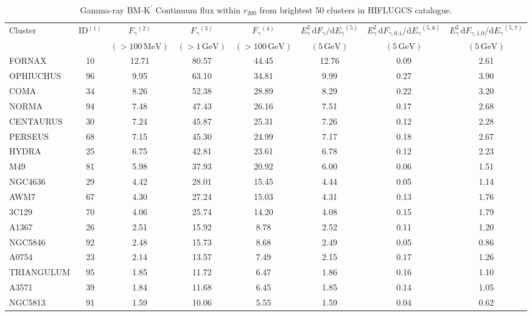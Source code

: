 \documentclass[10pt,aps,pra,reprint,amsmath,amsfonts,amssymb,showpacs,nofootinbib,floatfix]{revtex4-1}
\newcommand{\rmn}{\mathrm}
\newcommand{\Kp}{\rmn{K}^\prime}
\newcommand{\dd}{\rmn{d}}
\newcommand{\rvir}{r_{200}}
\newcommand{\eg}{E_\gamma}
\begin{document}
\begin{table}
\begin{minipage}{2.0\columnwidth}
  \caption{Gamma-ray BM-$\Kp$ Continuum flux within $\rvir$ from brightest 50 clusters in HIFLUGCS catalogue.}
\begin{tabular}{l  c c c c c c c}
\hline
\hline
 Cluster & ID$^{(1)}$ & $F_{\gamma}$$^{(2)}$ & $F_{\gamma}$$^{(3)}$& 
 $F_{\gamma}$$^{(4)}$ & $\eg^2\,\dd F_{\gamma}/\dd \eg$$^{(5)}$ &
 $\eg^2\,\dd F_{\gamma,0.1}/\dd \eg$$^{(5,6)}$ & 
 $\eg^2\,\dd F_{\gamma,1.0}/\dd \eg$$^{(5,7)}$\\
  & & $(>100\,\rmn{MeV})$ & $(>1\,\rmn{GeV})$ & $(>100\,\rmn{GeV})$ & 
 $(5\,\rmn{GeV})$ & $(5\,\rmn{GeV})$ &  $(5\,\rmn{GeV})$\\
 \hline
FORNAX   &  10 &  12.71 &  80.57 &  44.45 &  12.76 &   0.09 &   2.61 \\
OPHIUCHUS &  96 &   9.95 &  63.10 &  34.81 &   9.99 &   0.27 &   3.90 \\
COMA     &  34 &   8.26 &  52.38 &  28.89 &   8.29 &   0.22 &   3.20 \\
NORMA    &  94 &   7.48 &  47.43 &  26.16 &   7.51 &   0.17 &   2.68 \\
CENTAURUS &  30 &   7.24 &  45.87 &  25.31 &   7.26 &   0.12 &   2.28 \\
PERSEUS  &  68 &   7.15 &  45.30 &  24.99 &   7.17 &   0.18 &   2.67 \\
HYDRA    &  25 &   6.75 &  42.81 &  23.61 &   6.78 &   0.12 &   2.23 \\
M49      &  81 &   5.98 &  37.93 &  20.92 &   6.00 &   0.06 &   1.51 \\
NGC4636  &  29 &   4.42 &  28.01 &  15.45 &   4.44 &   0.05 &   1.14 \\
AWM7     &  67 &   4.30 &  27.24 &  15.03 &   4.31 &   0.13 &   1.76 \\
3C129    &  70 &   4.06 &  25.74 &  14.20 &   4.08 &   0.15 &   1.79 \\
A1367    &  26 &   2.51 &  15.92 &   8.78 &   2.52 &   0.11 &   1.20 \\
NGC5846  &  92 &   2.48 &  15.73 &   8.68 &   2.49 &   0.05 &   0.86 \\
A0754    &  23 &   2.14 &  13.57 &   7.49 &   2.15 &   0.17 &   1.26 \\
TRIANGULUM &  95 &   1.85 &  11.72 &   6.47 &   1.86 &   0.16 &   1.10 \\
A3571    &  39 &   1.84 &  11.68 &   6.45 &   1.85 &   0.14 &   1.05 \\
NGC5813  &  91 &   1.59 &  10.06 &   5.55 &   1.59 &   0.04 &   0.62 \\

\end{tabular}
\end{minipage}
\end{table}
\end{document}
